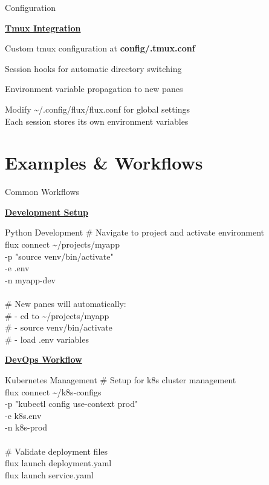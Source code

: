 \documentclass[10pt,a4paper]{article}
\begin{document}
\begin{multicols}{3}
\begin{textbox}{Configuration}

\underline{\textbf{Tmux Integration}}

Custom tmux configuration at \textbf{config/.tmux.conf}

Session hooks for automatic directory switching

Environment variable propagation to new panes


Modify \textasciitilde/.config/flux/flux.conf for global settings\\

Each session stores its own environment variables\\

\end{textbox}

\vfill\null
\columnbreak

\section{Examples \& Workflows}

\begin{textbox}{Common Workflows}

\underline{\textbf{Development Setup}}

\begin{simplecodebox}{Python Development}
\# Navigate to project and activate environment\\
flux connect \textasciitilde/projects/myapp \\
\phantom{xx}-p "source venv/bin/activate" \\
\phantom{xx}-e .env \\
\phantom{xx}-n myapp-dev\\
\\
\# New panes will automatically:\\
\# - cd to \textasciitilde/projects/myapp\\
\# - source venv/bin/activate\\
\# - load .env variables\\
\end{simplecodebox}

\underline{\textbf{DevOps Workflow}}

\begin{simplecodebox}{Kubernetes Management}
\# Setup for k8s cluster management\\
flux connect \textasciitilde/k8s-configs \\
\phantom{xx}-p "kubectl config use-context prod" \\
\phantom{xx}-e k8s.env \\
\phantom{xx}-n k8s-prod\\
\\
\# Validate deployment files\\
flux launch deployment.yaml\\
flux launch service.yaml\\
\end{simplecodebox}


\end{textbox}
\end{multicols}
\end{document}
